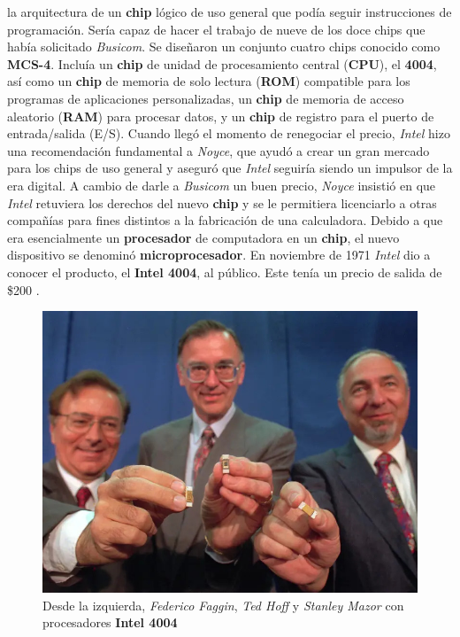 la arquitectura de un \textbf{chip} lógico de uso general que podía seguir instrucciones de programación. Sería capaz de hacer el trabajo de
nueve de los doce chips que había solicitado \emph{Busicom}. Se diseñaron un conjunto cuatro chips conocido como \textbf{MCS-4}. Incluía un
\textbf{chip} de unidad de procesamiento central (\textbf{CPU}), el \textbf{4004}, así como un \textbf{chip} de memoria de solo lectura
(\textbf{ROM}) compatible para los programas de aplicaciones personalizadas, un \textbf{chip} de memoria de acceso aleatorio (\textbf{RAM})
para procesar datos, y un \textbf{chip} de registro para el puerto de entrada/salida (E/S). Cuando llegó el momento de renegociar el precio,
\emph{Intel} hizo una recomendación fundamental a \emph{Noyce}, que ayudó a crear un gran mercado para los chips de uso general y aseguró que
\emph{Intel} seguiría siendo un impulsor de la era digital. A cambio de darle a \emph{Busicom} un buen precio, \emph{Noyce} insistió en que
\emph{Intel} retuviera los derechos del nuevo \textbf{chip} y se le permitiera licenciarlo a otras compañías para fines distintos a la
fabricación de una calculadora. Debido a que era esencialmente un \textbf{procesador} de computadora en un \textbf{chip}, el nuevo dispositivo se
denominó \textbf{microprocesador}. En noviembre de 1971 \emph{Intel} dio a conocer el producto, el \textbf{Intel 4004}, al público.
Este tenía un precio de salida de \$200 .

\begin{figure}[htb]
	\centering
	\includegraphics[scale = 0.25]{Graphics/faggin_hoff_mazor_-4004.jpg}
	\caption{Desde la izquierda, \emph{Federico Faggin}, \emph{Ted Hoff} y \emph{Stanley Mazor} con procesadores \textbf{Intel 4004}}
	\label{fig:10}
\end{figure}

